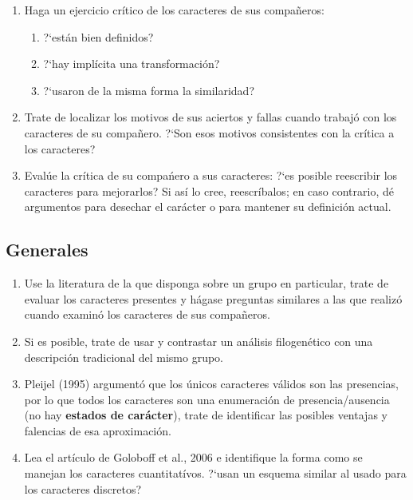 \begin{enumerate}
	\item Haga un ejercicio cr\'itico de los caracteres de sus compa\~neros:
	 
	\begin{enumerate}
		\item ?`est\'an bien definidos?	
		\item ?`hay impl\'icita una transformaci\'on?
		\item ?`usaron de la misma forma la similaridad?
	\end{enumerate}

	\item Trate de localizar los motivos de sus aciertos y fallas cuando trabaj\'o con los caracteres de su compa\~nero. ?`Son esos motivos consistentes con la cr\'itica a los caracteres?

	\item Eval\'ue la cr\'itica de su compa\'nero a sus caracteres: ?`es posible reescribir los caracteres para mejorarlos? Si as\'i lo cree, reescr\'ibalos; en caso contrario, d\'e argumentos para desechar el car\'acter o para mantener su definici\'on actual.
\end{enumerate}


\subsection*{Generales}

\begin{enumerate}
	\item Use la literatura de la que disponga sobre un grupo en particular, trate de evaluar los caracteres presentes y h\'agase preguntas similares a las que realiz\'o cuando examin\'o los caracteres de sus compa\~neros.\\

	\item Si es posible, trate de usar y contrastar un an\'alisis filogen\'etico con una descripci\'on tradicional del mismo grupo.\\

	\item Pleijel (1995) argument\'o que los \'unicos caracteres v\'alidos son las presencias, por lo que todos los caracteres son una enumeraci\'on  de presencia/ausencia (no hay \textbf{estados de car\'acter}), trate de identificar las posibles ventajas y falencias de esa aproximaci\'on.\\

	\item Lea el art\'iculo de Goloboff et al., 2006 e identifique la forma como se manejan los caracteres cuantitat\'ivos. ?`usan un esquema similar al usado para los caracteres discretos?
\end{enumerate}



